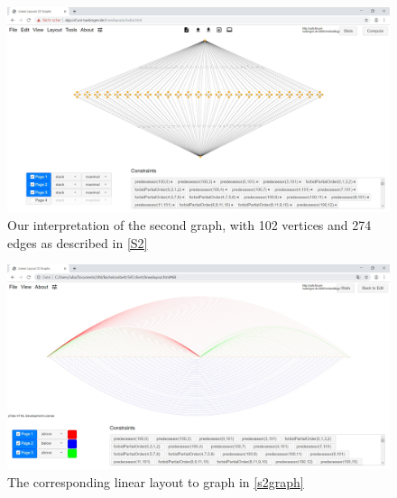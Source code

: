\begin{figure}[h!]
\begin{center}
\includegraphics[width=1\textwidth]{figures/stellated-102-274.jpg}
\caption{Our interpretation of the second graph, with 102 vertices and 274 edges as described in \autoref{S2} \label{s2graph}}
\end{center}
\end{figure}
\begin{figure}[h!]
\begin{center}\includegraphics[width=1\textwidth]{figures/stellated-102-274-Solution.jpg}
\caption{The corresponding linear layout to graph in \autoref{s2graph} \label{s2Sol}}
\end{center}
\end{figure}